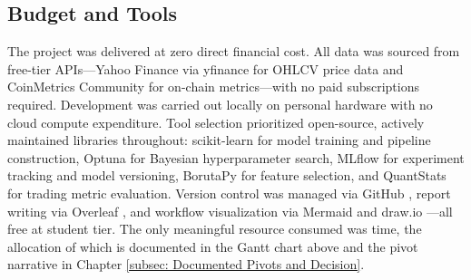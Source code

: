 \subsection{Budget and Tools}
The project was delivered at zero direct financial cost. All data was sourced from free-tier APIs—Yahoo Finance via yfinance \cite{YfinancedownloadYfinance} for OHLCV price data and CoinMetrics Community \cite{coinMetrics} for on-chain metrics—with no paid subscriptions required. Development was carried out locally on personal hardware with no cloud compute expenditure. Tool selection prioritized open-source, actively maintained libraries throughout: scikit-learn \cite{pedregosaScikitlearnMachineLearning2011} for model training and pipeline construction, Optuna \cite{akibaOptunaNextgenerationHyperparameter2019} for Bayesian hyperparameter search, MLflow \cite{MLflowOpenSource} for experiment tracking and model versioning, BorutaPy \cite{Boruta_pyBorutaBoruta_pypy} for feature selection, and QuantStats \cite{aroussiRanaroussiQuantstats2026} for trading metric evaluation. Version control was managed via GitHub \cite{GitHub2026}, report writing via Overleaf \cite{Us}, and workflow visualization via Mermaid \cite{MermaidAIPoweredDiagramming} and draw.io \cite{Drawio}—all free at student tier. The only meaningful resource consumed was time, the allocation of which is documented in the Gantt chart above and the pivot narrative in Chapter \ref{subsec: Documented Pivots and Decision}.